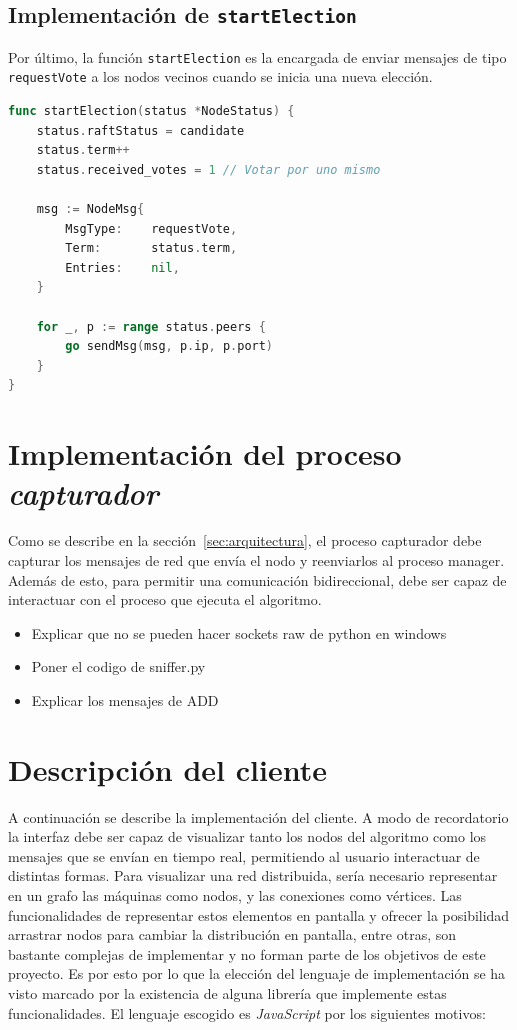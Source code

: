 \subsection{Implementación de \texttt{startElection}}

Por último, la función \texttt{startElection} es la encargada de enviar mensajes de tipo \texttt{requestVote} a los nodos vecinos cuando se inicia una nueva elección. 

\begin{lstlisting}[language=go]
func startElection(status *NodeStatus) {
	status.raftStatus = candidate
	status.term++
	status.received_votes = 1 // Votar por uno mismo

	msg := NodeMsg{
		MsgType:    requestVote,
		Term:       status.term,
		Entries:    nil,
	}

	for _, p := range status.peers {
		go sendMsg(msg, p.ip, p.port)
	}
}
\end{lstlisting}

\section{Implementación del proceso \textit{capturador}}

Como se describe en la sección~\ref{sec:arquitectura}, el proceso capturador debe capturar los mensajes de red que envía el nodo y reenviarlos al proceso manager. Además de esto, para permitir una comunicación bidireccional, debe ser capaz de interactuar con el proceso que ejecuta el algoritmo.

\begin{itemize}
\item Explicar que no se pueden hacer sockets raw de python en windows
\item Poner el codigo de sniffer.py
\item Explicar los mensajes de ADD
\end{itemize}

\section{Descripción del cliente}

A continuación se describe la implementación del cliente. A modo de recordatorio la interfaz debe ser capaz de visualizar tanto los nodos del algoritmo como los mensajes que se envían en tiempo real, permitiendo al usuario interactuar de distintas formas. Para visualizar una red distribuida, sería necesario representar en un grafo las máquinas como nodos, y las conexiones como vértices. Las funcionalidades de representar estos elementos en pantalla y ofrecer la posibilidad arrastrar nodos para cambiar la distribución en pantalla, entre otras, son bastante complejas de implementar y no forman parte de los objetivos de este proyecto. Es por esto por lo que la elección del lenguaje de implementación se ha visto marcado por la existencia de alguna librería que implemente estas funcionalidades. El lenguaje escogido es \textit{JavaScript} por los siguientes motivos:

